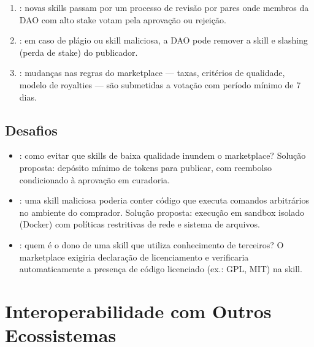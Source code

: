 \begin{enumerate}
    \item {}: novas skills passam por
    um processo de revisão por pares onde membros da DAO com alto
    stake votam pela aprovação ou rejeição.

    \item {}: em caso de plágio ou
    skill maliciosa, a DAO pode remover a skill e slashing (perda
    de stake) do publicador.

    \item {}: mudanças nas regras do
    marketplace --- taxas, critérios de qualidade, modelo de
    royalties --- são submetidas a votação com período mínimo de
    7 dias.
\end{enumerate}

\subsection{Desafios}

\begin{itemize}
    \item {}: como evitar que skills de baixa
    qualidade inundem o marketplace? Solução proposta: depósito
    mínimo de tokens para publicar, com reembolso condicionado à
    aprovação em curadoria.

    \item {}: uma skill maliciosa poderia conter
    código que executa comandos arbitrários no ambiente do
    comprador. Solução proposta: execução em sandbox isolado
    (Docker) com políticas restritivas de rede e sistema de arquivos.

    \item {}: quem é o dono de uma skill
    que utiliza conhecimento de terceiros? O marketplace exigiria
    declaração de licenciamento e verificaria automaticamente a
    presença de código licenciado (ex.: GPL, MIT) na skill.
\end{itemize}

\section{Interoperabilidade com Outros Ecossistemas}
\label{sec:interoperabilidade}
\nivelavancado

